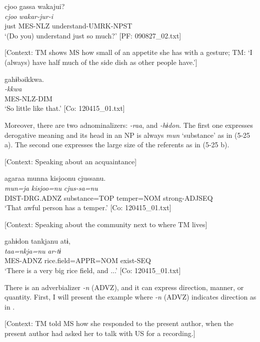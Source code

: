 \glll  cjoo  gassa  wakajui?\\
\textit{cjoo}  \textit{}  \textit{wakar-jur-i}\\
just  MES-NLZ  understand-UMRK-NPST\\
\glt ‘(Do you) understand just so much?’ [PF: 090827\_02.txt]

 \ex \label{ex:5:24b} [Context: TM shows MS how small of an appetite she has with a gesture; TM: ‘I (always) have half much of the side dish as other people have.’]

\glll  gahɨbəikkwa.\\
\textit{-kkwa}\\
MES-NLZ-DIM\\
\glt ‘So little like that.’ [Co: 120415\_01.txt]
\z
\z

  Moreover, there are two adnominalizers: \textit{{}-raa}, and \textit{{}-hɨdon}. The first one expresses derogative meaning and its head in an NP is always \textit{mun} ‘substance’ as in (5-25 a). The second one expresses the large size of the referents as in (5-25 b).

\ea \label{ex:5:25}  \ea \label{ex:5:25a} [Context: Speaking about an acquaintance]

\glll  agaraa  munna  kisjoonu  cjussanu.\\
\textit{}  \textit{mun=ja}  \textit{kisjoo=nu}  \textit{cjus-sa=nu}\\
DIST-DRG.ADNZ  substance=TOP  temper=NOM  strong-ADJSEQ\\
\glt ‘That awful person has a temper.’ [Co: 120415\_01.txt]

 \ex \label{ex:5:b} [Context: Speaking about the community next to where TM lives]

\glll  gahɨdon  tankjanu  atɨ,\\
\textit{}  \textit{taa=nkja=nu}  \textit{ar-tɨ}\\
MES-ADNZ  rice.field=APPR=NOM  exist-SEQ\\
\glt ‘There is a very big rice field, and ...’ [Co: 120415\_01.txt]
\z
\z

  There is an adverbializer \textit{-n} (ADVZ), and it can express direction, manner, or quantity. First, I will present the example where \textit{{}-n} (ADVZ) indicates direction as in .

\ea \label{ex:5:26}   [Context: TM told MS how she responded to the present author, when the present author had asked her to talk with US for a recording.]

